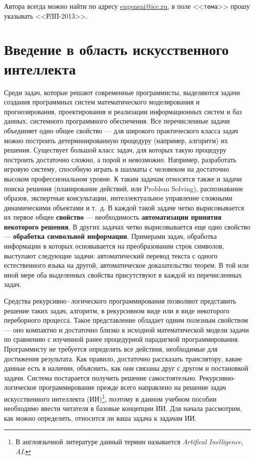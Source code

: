 \documentclass[12pt, openany, twoside]{book} %
\begin{document}
\vfill
\makeatletter
{} Автора всегда можно найти по адресу \href{mailto:eugeneai@icc.ru}{eugeneai@icc.ru}, в поле <<{\tt тема}>> прошу указывать <<РЛП-2013>>.
\makeatother

\chapter{Введение в область искусственного интеллекта}

Среди задач, которые решают современные программисты, выделяются задачи создания программных систем математического моделирования и прогнозирования, проектирования и реализации информационных систем и баз данных, системного программного обеспечения. Все перечисленные задачи объединяет одно общее свойство --- для широкого практического класса задач можно построить детерминированную процедуру (например, алгоритм) их решения. Существует большой класс задач, для которых такую процедуру построить достаточно сложно, а порой и невозможно. Например, разработать игровую систему, способную играть в шахматы с человеком на достаточно высоком профессиональном уровне. К таким задачам относятся также и задачи поиска решения (планирование действий, или Problem Sol\-ving), распознавание образов, экспертные консультации, интеллектуальное управление сложными динамическими объектами и т.~д. В каждой такой задаче четко вырисовывается их первое общее {\bf свойство} --- необходимость {\bf автоматизации принятия некоторого решения}. В других задачах четко вырисовывается еще одно свойство --- {\bf обработка символьной информации}. Примерами задач, обработка информации в которых основывается на преобразовании строк символов, выступают следующие задачи: автоматический перевод текста с одного естественного языка на другой, автоматическое доказательство теорем. В той или иной мере оба выделенных свойства присутствуют в каждой из перечисленных задач.

Средства рекурсивно\,{}-\,{}логического программирования позволяют представить решение таких задач, алгоритм, в рекурсивном виде или в виде некоторого переборного процесса. Такое представление обладает одним полезным свойством --- оно компактно и достаточно близко к исходной математической модели задачи по сравнению с изученной ранее процедурной парадигмой программирования. Программисту не требуется определять все действия, необходимые для достижения результата. Как правило, достаточно рассказать транслятору, какие данные есть в наличии, объяснить, как они связаны друг с другом и постановкой задачи. Система постарается получить решение самостоятельно. Рекурсивно-логическое программирование прежде всего направлено на решение задач искусственного интеллекта (ИИ)\footnote{В англоязычной литературе данный термин называется \emph{Artifical Inelligence, AI}.}, поэтому в данном учебном пособии необходимо ввести читателя в базовые концепции ИИ. Для начала рассмотрим, как можно определить, относится ли ваша задача к задачам ИИ.
\end{document}
